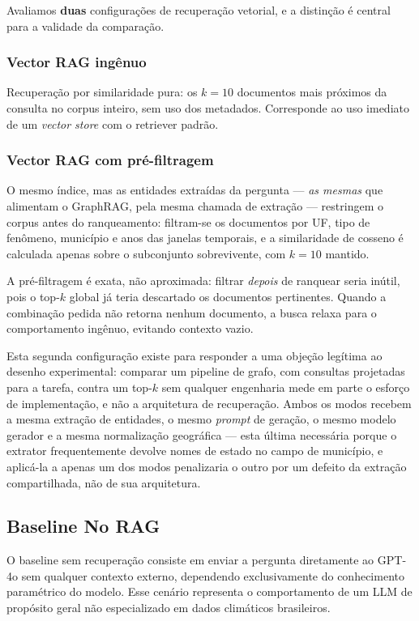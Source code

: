 \documentclass[conference]{IEEEtran}
\begin{document}
Avaliamos \textbf{duas} configurações de recuperação vetorial, e a distinção é
central para a validade da comparação.

\subsubsection{Vector RAG ingênuo}
Recuperação por similaridade pura: os $k=10$ documentos mais próximos da
consulta no corpus inteiro, sem uso dos metadados. Corresponde ao uso
imediato de um \textit{vector store} com o retriever padrão.

\subsubsection{Vector RAG com pré-filtragem}
O mesmo índice, mas as entidades extraídas da pergunta --- \emph{as mesmas} que
alimentam o GraphRAG, pela mesma chamada de extração --- restringem o corpus
antes do ranqueamento: filtram-se os documentos por UF, tipo de fenômeno,
município e anos das janelas temporais, e a similaridade de cosseno é calculada
apenas sobre o subconjunto sobrevivente, com $k=10$ mantido.

A pré-filtragem é exata, não aproximada: filtrar \emph{depois} de ranquear seria
inútil, pois o top-$k$ global já teria descartado os documentos pertinentes.
Quando a combinação pedida não retorna nenhum documento, a busca relaxa para o
comportamento ingênuo, evitando contexto vazio.

Esta segunda configuração existe para responder a uma objeção legítima ao
desenho experimental: comparar um pipeline de grafo, com consultas projetadas
para a tarefa, contra um top-$k$ sem qualquer engenharia mede em parte o esforço
de implementação, e não a arquitetura de recuperação. Ambos os modos recebem a
mesma extração de entidades, o mesmo \textit{prompt} de geração, o mesmo modelo
gerador e a mesma normalização geográfica --- esta última necessária porque o
extrator frequentemente devolve nomes de estado no campo de município, e
aplicá-la a apenas um dos modos penalizaria o outro por um defeito da extração
compartilhada, não de sua arquitetura.

\subsection{Baseline No RAG}

O baseline sem recuperação consiste em enviar a pergunta diretamente
ao GPT-4o sem qualquer contexto externo, dependendo exclusivamente
do conhecimento paramétrico do modelo.
Esse cenário representa o comportamento de um LLM de propósito geral
não especializado em dados climáticos brasileiros.
\end{document}
